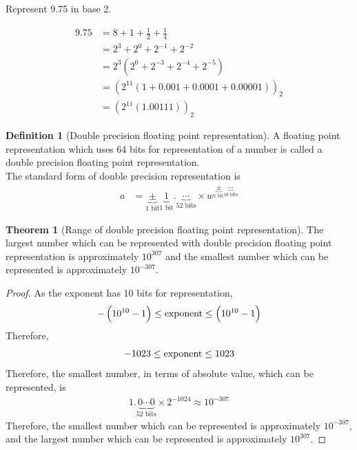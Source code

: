 \documentclass[fleqn, a4paper, 12pt, twoside]{article}
\theoremstyle{definition}
\newtheorem{definition}{Definition}
\theoremstyle{theorem}
\newtheorem{theorem}{Theorem}
\begin{document}
\begin{question}
	Represent 9.75 in base 2.
\end{question}

\begin{solution}
	\begin{align*}
		9.75 & = 8 + 1 + \frac{1}{2} + \frac{1}{4}                                   \\
                     & = 2^3 + 2^0 + 2^{-1} + 2^{-2}                                         \\
                     & = 2^3 \left( 2^0 + 2^{-3} + 2^{-4} + 2^{-5} \right)                   \\
                     & = \left( 2^{11} \left( 1 + 0.001 + 0.0001 + 0.00001 \right) \right)_2 \\
                     & = \left( 2^{11} \left( 1.00111 \right) \right)_2
	\end{align*}
\end{solution}

\begin{definition}[Double precision floating point representation]
	A floating point representation which uses 64 bits for representation of a number is called a double precision floating point representation.\\
	The standard form of double precision representation is
	\begin{align*}
		a & = \underbrace{\pm}_{\text{1 bit}} \underbrace{1}_{\text{1 bit}}.\underbrace{\cdots}_{\text{52 bits}} \times w^{\underbrace{\pm}_{\text{1 bit}} \underbrace{\cdots}_{\text{10 bits}}}
	\end{align*}
\end{definition}

\begin{theorem}[Range of double precision floating point representation]
	The largest number which can be represented with double precision floating point representation is approximately $10^{307}$ and the smallest number which can be represented is approximately $10^{-307}$.
	\label{Range_of_double_precision_floating_point_representation}
\end{theorem}

\begin{proof}
	As the exponent has 10 bits for representation,
	\begin{equation*}
		-\left( 10^{10} - 1 \right) \le \textnormal{exponent} \le \left( 10^{10} - 1 \right)
	\end{equation*}
	Therefore,
	\begin{equation*}
		-1023 \le \textnormal{exponent} \le 1023
	\end{equation*}
	Therefore, the smallest number, in terms of absolute value, which can be represented, is
	\begin{align*}
		1.\underbrace{0 \cdots 0}_{\text{52 bits}} \times 2^{-1024} \approx 10^{-307}
	\end{align*}
	Therefore, the smallest number which can be represented is approximately $10^{-307}$, and the largest number which can be represented is approximately $10^{307}$.
\end{proof}
\end{document}
